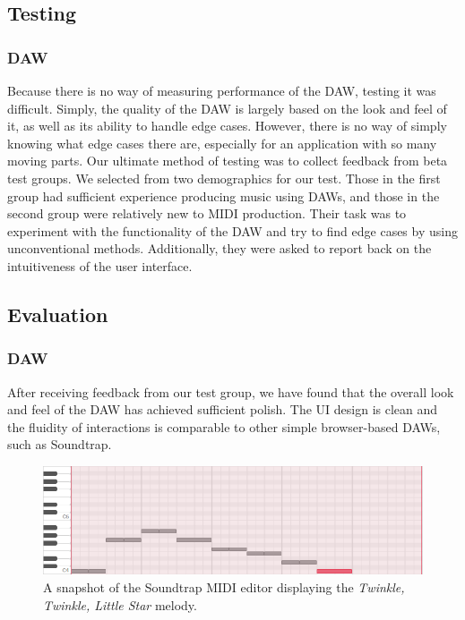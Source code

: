 \subsection{Testing}

\subsubsection{DAW}

Because there is no way of measuring performance of the DAW, testing it was difficult. Simply, the
quality of the DAW is largely based on the look and feel of it, as well as its ability to handle
edge cases. However, there is no way of simply knowing what edge cases there are, especially for
an application with so many moving parts. Our ultimate method of testing was to collect feedback
from beta test groups. We selected from two demographics for our test. Those in the first group
had sufficient experience producing music using DAWs, and those in the second group were relatively
new to MIDI production. Their task was to experiment with the functionality of the DAW and try to
find edge cases by using unconventional methods. Additionally, they were asked to report back on
the intuitiveness of the user interface.

\subsection{Evaluation}

\subsubsection{DAW}

After receiving feedback from our test group, we have found that the overall look and feel of the
DAW has achieved sufficient polish. The UI design is clean and the fluidity of interactions is
comparable to other simple browser-based DAWs, such as Soundtrap.

\begin{figure}[h!]
  \centering
  \includegraphics[width=\linewidth]{image/Soundtrap.png}
  \caption{A snapshot of the Soundtrap MIDI editor displaying the \textit{Twinkle, Twinkle, Little Star} melody.}
  \label{fig:soundtrap}
\end{figure}

